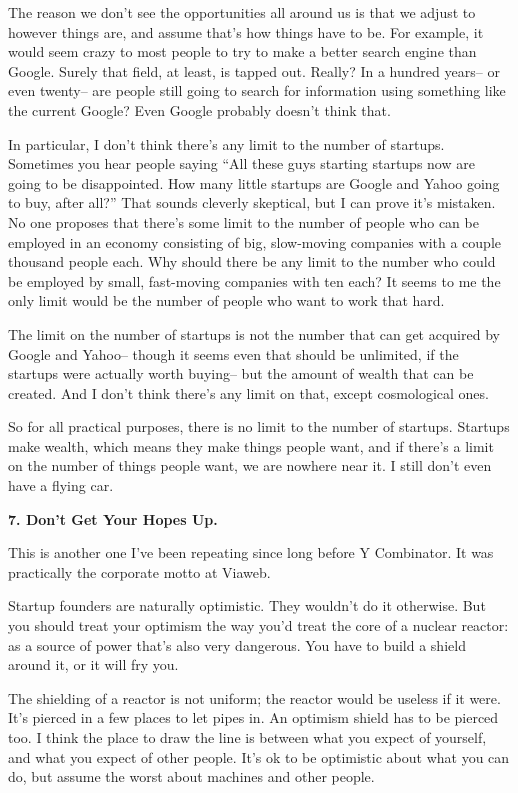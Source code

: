 \documentclass[12pt]{book}
\begin{document}
The reason we don't see the opportunities all around us is that we
adjust to however things are, and assume that's how things have to be.
For example, it would seem crazy to most people to try to make a better
search engine than Google. Surely that field, at least, is tapped out.
Really? In a hundred years-- or even twenty-- are people still going to
search for information using something like the current Google? Even
Google probably doesn't think that.

In particular, I don't think there's any limit to the number of
startups. Sometimes you hear people saying ``All these guys starting
startups now are going to be disappointed. How many little startups are
Google and Yahoo going to buy, after all?'' That sounds cleverly
skeptical, but I can prove it's mistaken. No one proposes that there's
some limit to the number of people who can be employed in an economy
consisting of big, slow-moving companies with a couple thousand people
each. Why should there be any limit to the number who could be employed
by small, fast-moving companies with ten each? It seems to me the only
limit would be the number of people who want to work that hard.

The limit on the number of startups is not the number that can get
acquired by Google and Yahoo-- though it seems even that should be
unlimited, if the startups were actually worth buying-- but the amount
of wealth that can be created. And I don't think there's any limit on
that, except cosmological ones.

So for all practical purposes, there is no limit to the number of
startups. Startups make wealth, which means they make things people
want, and if there's a limit on the number of things people want, we are
nowhere near it. I still don't even have a flying car.

\textbf{7. Don't Get Your Hopes Up.}

This is another one I've been repeating since long before Y Combinator.
It was practically the corporate motto at Viaweb.

Startup founders are naturally optimistic. They wouldn't do it
otherwise. But you should treat your optimism the way you'd treat the
core of a nuclear reactor: as a source of power that's also very
dangerous. You have to build a shield around it, or it will fry you.

The shielding of a reactor is not uniform; the reactor would be useless
if it were. It's pierced in a few places to let pipes in. An optimism
shield has to be pierced too. I think the place to draw the line is
between what you expect of yourself, and what you expect of other
people. It's ok to be optimistic about what you can do, but assume the
worst about machines and other people.
\end{document}
